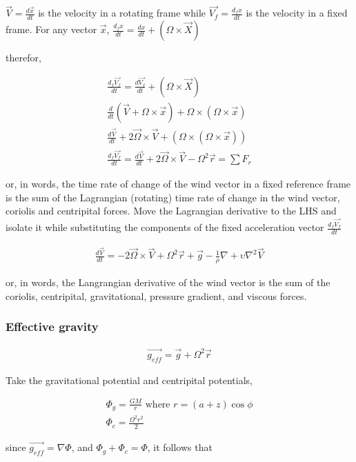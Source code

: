 \documentclass[a4paper,12pt]{article}
\begin{document}
$\vec{V} = \frac{d\vec{x}}{dt}$ is the velocity in a rotating frame while $\vec{V_f} = \frac{d_fx}{dt}$ is the velocity in a fixed frame.
For any vector $\vec{x}$,   $\frac{d_fx}{dt} = \frac{dx}{dt} + (\Omega \times \vec{X})$


therefor, 

\begin{align}
\frac{d_f\vec{V_f}}{dt} = \frac{d\vec{V_f}}{dt} + (\Omega \times \vec{X})\\
\frac{d}{dt}(\vec{V} + \Omega \times \vec{x}) + \Omega \times (\Omega \times \vec{x})\\
\frac{d\vec{V}}{dt} + 2\vec{\Omega} \times \vec{V} + (\Omega \times (\Omega \times \vec{x}))\\
\frac{d_f\vec{V_f}}{dt} = \frac{d\vec{V}}{dt} + 2\vec{\Omega} \times \vec{V} - \Omega^2\vec{r} = \sum{F_r}
\end{align}

or, in words, the time rate of change of the wind vector in a fixed reference frame is the sum of the Lagrangian (rotating) time rate of change in the wind vector, coriolis and centripital forces. Move the Lagrangian derivative to the LHS and isolate it while substituting the components of the fixed acceleration vector $\frac{d_f\vec{V_f}}{dt}$

\begin{align}
 \frac{d\vec{V}}{dt} = - 2\vec{\Omega} \times \vec{V} + \Omega^2\vec{r} + \vec{g} - \frac{1}{\rho}\nabla + \upsilon\nabla^2\vec{V}
\end{align}

or, in words, the Langrangian derivative of the wind vector is the sum of the coriolis, centripital, gravitational, pressure gradient, and viscous forces.

\subsubsection*{Effective gravity}
\begin{align}
\vec{g_{eff}} = \vec{g} + \Omega^2\vec{r} 
\end{align}

Take the gravitational potential and centripital potentials,

\begin{align}
\Phi_g = \frac{GM}{r} \text{ where } r = (a+z)\cos{\phi}\\
\Phi_c = \frac{\Omega^2r^2}{2}
\end{align}

since $\vec{g_{eff}} = \nabla \Phi$, and $\Phi_g + \Phi_c = \Phi$, it follows that
\end{document}
